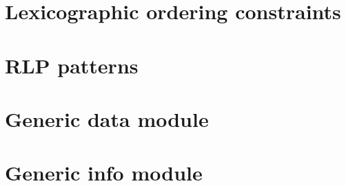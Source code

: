 \documentclass[fleqn]{report}
\begin{document}
\appendix
\chapter{Lexicographic ordering constraints}         \label{chap: lex}             \minitoc    
\chapter{RLP patterns}                               \label{chap: RLP patterns}    \minitoc    
\chapter{Generic data module}                        \label{chap: generic data}    \minitoc    
\chapter{Generic info module}                        \label{chap: generic info}    \minitoc    

\nocite{*}

\printbibliography %
\end{document}
